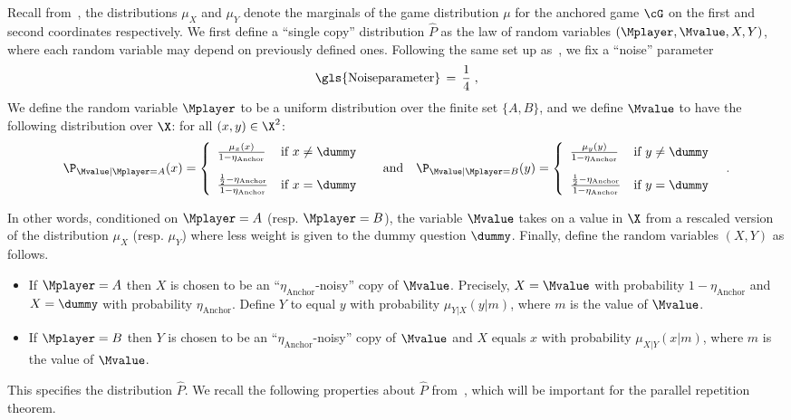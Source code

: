 Recall from~, the distributions $\mu_X$ and $\mu_Y$ denote the marginals of the game distribution $\mu$ for the anchored game $\cG$ on the first and second coordinates respectively. We first define a ``single copy'' distribution $\hat{P}$ as the law of random variables $(\Mplayer,\Mvalue,X,Y)$, where each random variable may depend on previously defined ones. Following the same set up as~\cite[Section 4.1]{bavarianAnchoredParallelRepetition2021},  we fix a ``noise'' parameter 
\begin{equation}
	\label{eq:def-eta}
	\text{\gls{Noiseparameter}} \,=\, \frac{1}{4}\;,
\end{equation}
We define the random variable $\Mplayer$ to be a uniform distribution over the finite set $\{A,B\}$, and we define $\Mvalue$ to have the following distribution over $\X$: for all $(x,y) \in \X^2$:
\[
\P_{\Mvalue | \Mplayer = A}(x) = \left\{
\begin{array}{ll}
	\frac{\mu_x(x)}{1 - \eta_{\text{Anchor}}}  & \mbox{if $x \neq \dummy$} \\[4mm]
	\frac{\frac{1}{2} - \eta_{\text{Anchor}}}{1 - \eta_{\text{Anchor}}} & \mbox{if $x = \dummy$ }
\end{array}
\right. \quad \text{and} \quad
\P_{\Mvalue | \Mplayer = B}(y) = \left\{
\begin{array}{ll}
	\frac{\mu_y(y)}{1 - \eta_{\text{Anchor}}}  & \mbox{if $y \neq \dummy$} \\[4mm]
	\frac{\frac{1}{2} - \eta_{\text{Anchor}}}{1 - \eta_{\text{Anchor}}} & \mbox{if $y = \dummy$ }
\end{array}
\right. \;.
\]

In other words, conditioned on $\Mplayer=A$ (resp. $\Mplayer = B$), the variable $\Mvalue$ takes on a value in $\X$ from a rescaled version of the distribution $\mu_X$ (resp. $\mu_Y$) where less weight is given to the dummy question $\dummy$.  Finally, define the random variables $(X,Y)$ as follows. 
\begin{itemize}
	\item If $\Mplayer = A$ then $X$ is chosen to be an ``$\eta_{\text{Anchor}}$-noisy'' copy of $\Mvalue$. Precisely, $X = \Mvalue$ with probability $1 - \eta_{\text{Anchor}}$ and $X = \dummy$ with probability $\eta_{\text{Anchor}}$. Define $Y$ to equal $y$ with probability $\mu_{Y|X}(y | m)$, where $m$ is the value of $\Mvalue$. 
	\item If $\Mplayer = B$ then $Y$ is chosen to be an ``$\eta_{\text{Anchor}}$-noisy'' copy of $\Mvalue$ and $X$ equals $x$ with probability $\mu_{X|Y}(x | m)$, where $m$ is the value of $\Mvalue$. 
\end{itemize}
This specifies the distribution $\hat{P}$. We recall the following properties about $\hat{P}$ from~\cite{bavarianAnchoredParallelRepetition2021}, which will be important for the parallel repetition theorem. 

